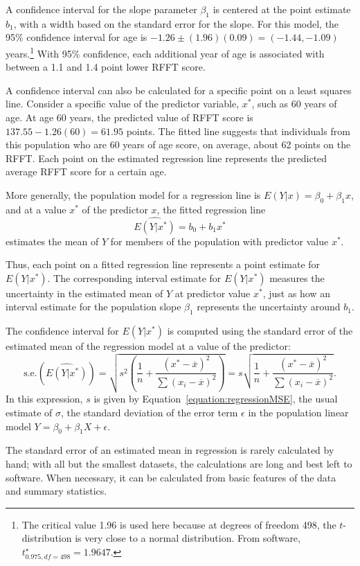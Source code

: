 A confidence interval for the slope parameter $\beta_1$ is centered at the point estimate $b_1$, with a width based on the standard error for the slope. For this model, the 95\% confidence interval for age is  $-1.26 \pm (1.96)(0.09) = (-1.44, -1.09)$ years.\footnote{The critical value 1.96 is used here because at degrees of freedom 498, the $t$-distribution is very close to a normal distribution. From software, $t^\star_{0.975, df = 498} = 1.9647$.} With 95\% confidence, each additional year of age is associated with between a 1.1 and 1.4 point lower RFFT score.

A confidence interval can also be calculated for a specific point on a least squares line. Consider a specific value of the predictor variable, $x^*$, such as 60 years of age. At age 60 years, the predicted value of RFFT score is $137.55 - 1.26(60) = 61.95$ points. The fitted line suggests that individuals from this population who are 60 years of age score, on average, about 62 points on the RFFT. Each point on the estimated regression line represents the predicted average RFFT score for a certain age.

More generally, the population model for a regression line is $E(Y|x) = \beta_0 + \beta_1 x$, and at a value $x^*$ of the predictor $x$, the fitted regression line 
\[ \widehat{E(Y|x^*)} = b_0 + b_1 x^* \]
estimates the mean of $Y$ for members of the population with predictor value $x^*$.

Thus, each point on a fitted regression line represents a point estimate for $E(Y|x^*)$. The corresponding interval estimate for $E(Y|x^*)$ measures the uncertainty in the estimated mean of $Y$ at predictor value $x^*$, just as how an interval estimate for the population slope $\beta_1$ represents the uncertainty around $b_1$. 


The confidence interval for $E(Y|x^*)$ is computed using the standard error of the estimated mean of the regression model at a value of the predictor:  
\[\text{s.e.}(\widehat{E(Y|x^*)}) = \sqrt{s^2 \left( \frac{1}{n} + \dfrac{(x^*-\overline{x})^2}{\sum(x_i-\overline{x})^2}\right)} = s\sqrt{\frac{1}{n} + \dfrac{(x^*-\overline{x})^2}{\sum(x_i-\overline{x})^2}}.  \]
In this expression, $s$ is given by Equation~\ref{equation:regressionMSE}, the usual estimate of $\sigma$, the standard deviation of the error term $\epsilon$ in the population linear model $Y = \beta_0 + \beta_1X + \epsilon$.

The standard error of an estimated mean in regression is rarely calculated by hand; with all but the smallest datasets, the calculations are long and best left to software.  When necessary, it can be calculated from basic features of the data and summary statistics.  

